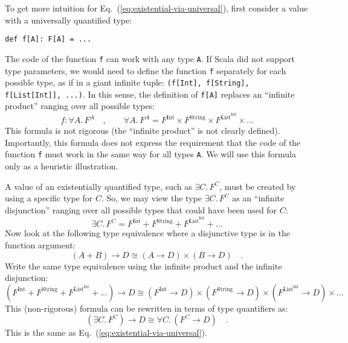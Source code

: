 To get more intuition for Eq.~(\ref{eq:existential-via-universal}),
first consider a value with a universally quantified type:
\begin{lstlisting}
def f[A]: F[A] = ...
\end{lstlisting}
The code of the function \lstinline!f!
can work with any type \lstinline!A!.
If Scala did not support type parameters, we would need to define
the function \lstinline!f!
separately for each possible type, as if in a giant infinite tuple:
\lstinline!(f[Int], f[String], f[List[Int]], ...)!.
In this sense, the definition of \lstinline!f[A]!
replaces an \textsf{``}infinite product\textsf{''} ranging over all possible types:
\[
f:\forall A.\,F^{A}\quad,\quad\quad\forall A.\,F^{A}=F^{\text{Int}}\times F^{\text{String}}\times F^{\text{List}^{\text{Int}}}\times...
\]
This formula is not rigorous (the \textsf{``}infinite product\textsf{''} is not clearly
defined). Importantly, this formula does not express the requirement
that the code of the function \lstinline!f!
must work in the same way for all types \lstinline!A!.
We will use this formula only as a heuristic illustration.

A value of an existentially quantified type, such as $\exists C.\,F^{C}$,
must be created by using a specific type for $C$. So, we may view
the type $\exists C.\,F^{C}$ as an \textsf{``}infinite disjunction\textsf{''} ranging
over all possible types that could have been used for $C$:
\[
\exists C.\,F^{C}=F^{\text{Int}}+F^{\text{String}}+F^{\text{List}^{\text{Int}}}+...
\]
Now look at the following type equivalence where a disjunctive type
is in the function argument:
\[
\left(A+B\right)\rightarrow D\cong\left(A\rightarrow D\right)\times\left(B\rightarrow D\right)\quad.
\]
Write the same type equivalence using the infinite product and the
infinite disjunction:
\[
(F^{\text{Int}}+F^{\text{String}}+F^{\text{List}^{\text{Int}}}+...)\rightarrow D\cong(F^{\text{Int}}\rightarrow D)\times(F^{\text{String}}\rightarrow D)\times(F^{\text{List}^{\text{Int}}}\rightarrow D)\times...
\]
This (non-rigorous) formula can be rewritten in terms of type quantifiers
as:
\[
(\exists C.\,F^{C})\rightarrow D\cong\forall C.\,(F^{C}\rightarrow D)\quad.
\]
This is the same as Eq.~(\ref{eq:existential-via-universal}).

